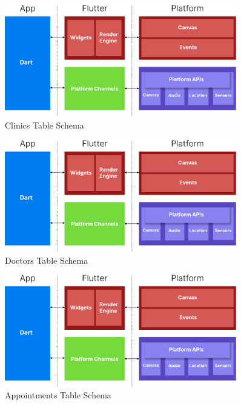 \documentclass[12pt]{report}
\begin{document}
\begin{figure}[H]
    \centering
    \includegraphics[width=0.9\textwidth]{images/FlutterDiagram@2x.pdf}    \caption{Clinics Table Schema}
\end{figure}

\vspace{0.5cm}

\begin{figure}[H]
    \centering
    \includegraphics[width=0.9\textwidth]{images/FlutterDiagram@2x.pdf}    \caption{Doctors Table Schema}
\end{figure}

\vspace{0.5cm}

\begin{figure}[H]
    \centering
    \includegraphics[width=0.9\textwidth]{images/FlutterDiagram@2x.pdf}    \caption{Appointments Table Schema}
\end{figure}
\end{document}
